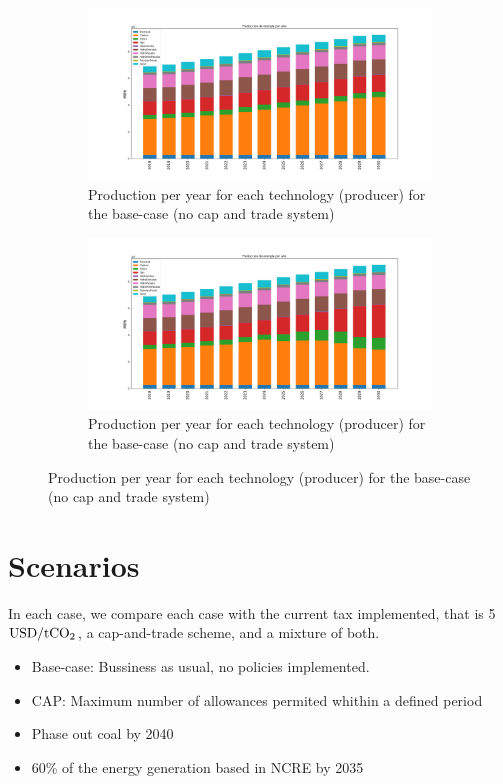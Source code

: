 \documentclass[11pt, letterpaper]{article}
\begin{document}
\begin{figure}[h!]
  \begin{subfigure}[b]{0.5\textwidth}
    \includegraphics[width=\textwidth]{Apuntes/Figures/production_no_cnt_2030_annual.png}
    \caption{Production per year for each technology (producer) for the base-case (no cap and trade system)}
    \label{fig:2030nocnt_annual}
  \end{subfigure}\quad
  \begin{subfigure}[b]{0.5\textwidth}
    \includegraphics[width=\textwidth]{Apuntes/Figures/production_cnt_2030_annual.png}
    \caption{Production per year for each technology (producer) for the base-case (no cap and trade system)}
    \label{fig:2030cnt_annual}
  \end{subfigure}
\end{figure}


\section{Scenarios}
In each case, we compare each case with the current tax implemented, that is 5 $\rm USD/tCO_2$, a cap-and-trade scheme, and a mixture of both. 

\begin{itemize}
    \item Base-case: Bussiness as usual, no policies implemented. 
    \item CAP: Maximum number of allowances permited whithin a defined period
    
    \item Phase out coal by 2040
    
    \item 60\% of the energy generation based in NCRE by 2035

\end{itemize}
\end{document}
